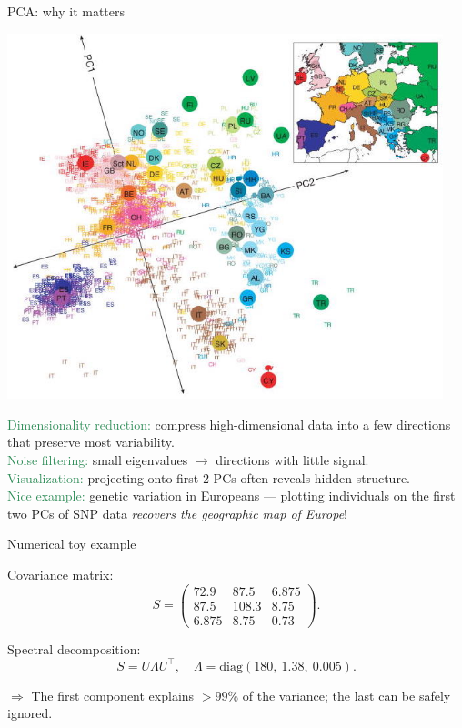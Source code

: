 \documentclass[11pt,aspectratio=169]{beamer}
\begin{document}
\begin{frame}{PCA: why it matters}

\begin{minipage}{7cm}
\includegraphics[width=0.95\textwidth]{img/genomemap}	
\end{minipage}\begin{minipage}{8cm}
\textcolor{SeaGreen}{Dimensionality reduction:} compress high-dimensional data into a few directions that preserve most variability.\\[3mm]
\textcolor{SeaGreen}{Noise filtering:} small eigenvalues $\to$ directions with little signal.\\[3mm]
	\textcolor{SeaGreen}{Visualization:} projecting onto first 2 PCs often reveals hidden structure.\\[3mm]
	\textcolor{SeaGreen}{Nice example:} genetic variation in Europeans — plotting individuals on the first two PCs of SNP data \textit{recovers the geographic map of Europe}!  
\end{minipage}
\end{frame}


\begin{frame}{Numerical toy example}
\begin{small}
Covariance matrix:
\[
S=
\begin{pmatrix}
72.9&87.5&6.875\\
87.5&108.3&8.75\\
6.875&8.75&0.73
\end{pmatrix}.
\]

Spectral decomposition:
\[
S = U \Lambda U^\top, \quad
\Lambda=\mathrm{diag}(180,\ 1.38,\ 0.005).
\]

$\Rightarrow$ The first component explains $>99\%$ of the variance; the last can be safely ignored.  
\end{small}
\end{frame}
\end{document}
